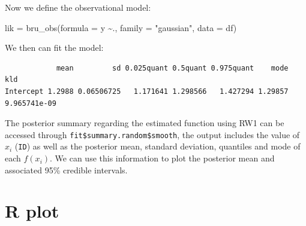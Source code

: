 \documentclass[
  letterpaper,
  DIV=11,
  numbers=noendperiod]{scrartcl}
\newenvironment{Shaded}{\begin{snugshade}}{\end{snugshade}}
\newcommand{\AttributeTok}[1]{\textcolor[rgb]{0.40,0.45,0.13}{#1}}
\newcommand{\FunctionTok}[1]{\textcolor[rgb]{0.28,0.35,0.67}{#1}}
\newcommand{\NormalTok}[1]{\textcolor[rgb]{0.00,0.23,0.31}{#1}}
\newcommand{\OtherTok}[1]{\textcolor[rgb]{0.00,0.23,0.31}{#1}}
\newcommand{\SpecialCharTok}[1]{\textcolor[rgb]{0.37,0.37,0.37}{#1}}
\newcommand{\StringTok}[1]{\textcolor[rgb]{0.13,0.47,0.30}{#1}}
\begin{document}
Now we define the observational model:

\begin{Shaded}
\begin{Highlighting}[]
\NormalTok{lik }\OtherTok{=}  \FunctionTok{bru\_obs}\NormalTok{(}\AttributeTok{formula =}\NormalTok{ y }\SpecialCharTok{\textasciitilde{}}\NormalTok{.,}
            \AttributeTok{family =} \StringTok{"gaussian"}\NormalTok{,}
            \AttributeTok{data =}\NormalTok{ df)}
\end{Highlighting}
\end{Shaded}

We then can fit the model:

\begin{Shaded}
\end{Shaded}

\begin{verbatim}
            mean         sd 0.025quant 0.5quant 0.975quant    mode          kld
Intercept 1.2988 0.06506725   1.171641 1.298566   1.427294 1.29857 9.965741e-09
\end{verbatim}

The posterior summary regarding the estimated function using RW1 can be
accessed through \texttt{fit\$summary.random\$smooth}, the output
includes the value of \(x_i\) (\texttt{ID}) as well as the posterior
mean, standard deviation, quantiles and mode of each \(f(x_i)\). We can
use this information to plot the posterior mean and associated 95\%
credible intervals.

\section{R plot}
\end{document}
